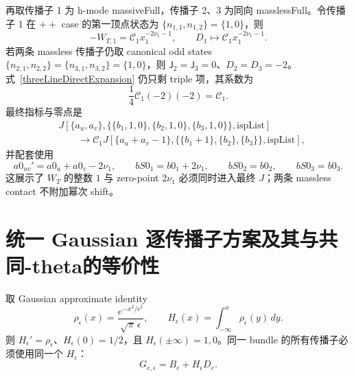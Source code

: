 ﻿\documentclass[a4paper,11pt]{article}
\begin{document}
再取传播子 1 为 h-mode massiveFull，传播子 2、3 为同向 masslessFull。令传播子 1 在 $++$ case 的第一顶点状态为 $\{n_{1,1},n_{1,2}\}=\{1,0\}$，则
\begin{equation}
 -W_{T,1}=\mathcal C_1x_1^{-2\nu_1-1},
 \qquad D_1\longmapsto\mathcal C_1x_1^{-2\nu_1-1}.
\end{equation}
若两条 massless 传播子仍取 canonical odd states $\{n_{2,1},n_{2,2}\}=\{n_{3,1},n_{3,2}\}=\{1,0\}$，则 $\mathsf J_2=\mathsf J_3=0$、$D_2=D_3=-2$。式~\eqref{threeLineDirectExpansion} 仍只剩 triple 项，其系数为
\begin{equation}
 \frac14\mathcal C_1(-2)(-2)=\mathcal C_1.
\end{equation}
最终指标与零点是
\begin{align}
 &J\!\left[\{a_u,a_v\},
  \{\{b_1,1,0\},\{b_2,1,0\},\{b_3,1,0\}\},\mathrm{ispList}\right]
 \nonumber\\
 &\qquad\longrightarrow
 \mathcal C_1
 J\!\left[\{a_u+a_v-1\},
  \{\{b_1+1\},\{b_2\},\{b_3\}\},\mathrm{ispList}\right],
 \label{mixedThreeLineIndexExample}
\end{align}
并配套使用
\begin{equation}
 a0_{uv}'=a0_u+a0_v-2\nu_1,
 \qquad bS0_1=b0_1+2\nu_1,
 \qquad bS0_2=b0_2,
 \qquad bS0_3=b0_3.
\end{equation}
这展示了 $W_T$ 的整数 $1$ 与 zero-point $2\nu_1$ 必须同时进入最终 $J$；两条 massless contact 不附加幂次 shift。

\section{统一 Gaussian 逐传播子方案及其与共同-theta的等价性}
\label{app:gaussianDerivation}

取 Gaussian approximate identity
\begin{equation}
 \rho_\epsilon(x)=\frac{e^{-x^2/\epsilon^2}}{\sqrt\pi\,\epsilon},
 \qquad
 H_\epsilon(x)=\int_{-\infty}^{x}\rho_\epsilon(y)\,dy.
 \label{gaussianMollifier}
\end{equation}
则 $H_\epsilon'=\rho_\epsilon$、$H_\epsilon(0)=1/2$，且 $H_\epsilon(\pm\infty)=1,0$。同一 bundle 的所有传播子必须使用同一个 $H_\epsilon$：
\begin{equation}
 G_{e,\epsilon}=B_e+H_\epsilon D_e.
 \label{regularizedLine}
\end{equation}
\end{document}
